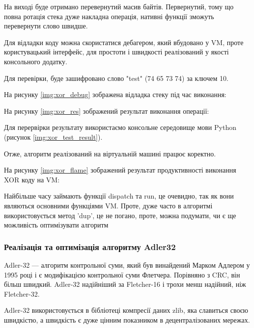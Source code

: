 \documentclass{lib/styles/default-style}
\begin{document}
    На виході буде отримано перевернутий масив байтів. Первернутий, тому що повна ротація стека дуже накладна операція, нативні функції
    зможуть перевернути слово швидше.

    Для відладки коду можна скористатися дебагером, який вбудовано у VM, проте користувацький інтерфейс, для простоти і швидкості
    реалізований у якості консольного додатку.

    Для перевірки, буде зашифровано слово "test" (74 65 73 74) за ключем 10.

    На рисунку \ref{img:xor_debug} зображена відладка стеку під час виконання:

    
    На рисунку \ref{img:xor_res} зображений результат виконання операції:

    
    Для перервірки результату використаємо консольне середовище мови Python (рисунок \ref{img:xor_test_result}).


    Отже, алгоритм реалізований на віртуальній машині працює коректно.

    На рисунку \ref{img:xor_flame} зображений результат продуктивності виконання XOR коду на VM:


    Найбільше часу займають функції dispatch та run, це очевидно, так як вони являються основними функціями VM.
    Проте, дуже часто в алгоритмі використовується метод 'dup', це не погано,
    проте, можна подумати, чи є ще можливість оптимізувати алгоритм

    \subsubsection{Реалізація та оптимізація алгоритму Adler32}
    
    Adler-32 --- алгоритм контрольної суми, який був винайдений Марком Адлером у 1995 році і є модифікацією контрольної суми Флетчера.
    Порівняно з CRC, він більш швидкий. Adler-32 надійніший за Fletcher-16 і трохи менш надійний, ніж Fletcher-32.

    Adler-32 використовується в бібліотеці компресії даних zlib, яка славиться своєю швидкістю, а швидкість є дуже цінним показником
    в децентралізованих мережах.
\end{document}
